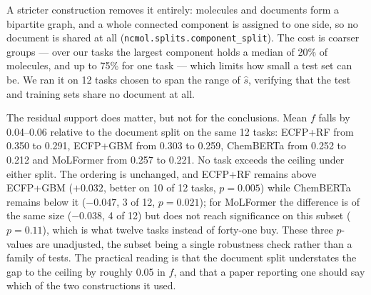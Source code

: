 A stricter construction removes it entirely: molecules and documents form a bipartite graph, and a whole connected component is assigned to one side, so no document is shared at all (\texttt{ncmol.splits.}\allowbreak\texttt{component\_split}). The cost is coarser groups --- over our tasks the largest component holds a median of 20\% of molecules, and up to 75\% for one task --- which limits how small a test set can be. We ran it on 12 tasks chosen to span the range of $\hat s$, verifying that the test and training sets share no document at all.

The residual support does matter, but not for the conclusions. Mean $f$ falls by 0.04--0.06 relative to the document split on the same 12 tasks: ECFP+RF from 0.350 to 0.291, ECFP+GBM from 0.303 to 0.259, ChemBERTa from 0.252 to 0.212 and MoLFormer from 0.257 to 0.221. No task exceeds the ceiling under either split. The ordering is unchanged, and ECFP+RF remains above ECFP+GBM ($+0.032$, better on 10 of 12 tasks, $p=0.005$) while ChemBERTa remains below it ($-0.047$, 3 of 12, $p=0.021$); for MoLFormer the difference is of the same size ($-0.038$, 4 of 12) but does not reach significance on this subset ($p=0.11$), which is what twelve tasks instead of forty-one buy. These three $p$-values are unadjusted, the subset being a single robustness check rather than a family of tests. The practical reading is that the document split understates the gap to the ceiling by roughly 0.05 in $f$, and that a paper reporting one should say which of the two constructions it used.
